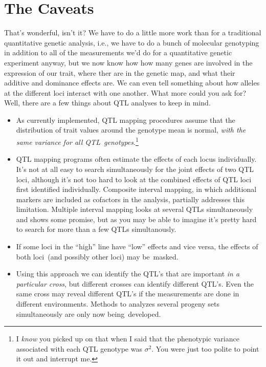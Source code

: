 \section*{The Caveats}

That's wonderful, isn't it? We have to do a little more work than for
a traditional quantitative genetic analysis, i.e., we have to do a
bunch of molecular genotyping in addition to all of the measurements
we'd do for a quantitative genetic experiment anyway, but we now know
how how many genes are involved in the expression of our trait, where
ther are in the genetic map, and what their additive and dominance effects
are. We can even tell something about how alleles at the different
loci interact with one another. What more could you ask for? Well,
there are a few things about QTL analyses to keep in mind.

\begin{itemize}

\item As currently implemented, QTL mapping procedures assume that the
  distribution of trait values around the genotype mean is normal,
  {\it with the same variance for all QTL~genotypes}.\footnote{I {\it
      know\/} you picked up on that when I said that the phenotypic
    variance associated with each QTL genotype was $\sigma^2$. You
    were just too polite to point it out and interrupt me.}

\item QTL mapping programs often estimate the effects of each locus
  individually. It's not at all easy to search simultaneously for the
  joint effects of two QTL loci, although it's not too hard to look at
  the combined effects of QTL loci first identified
  individually. Composite interval mapping, in which additional
  markers are included as cofactors in the analysis, partially
  addresses this limitation. Multiple interval mapping looks at
  several QTLs simultaneously and shows some promise, but as you may
  be able to imagine it's pretty hard to search for more than a few
  QTLs simultanously.

\item If some loci in the ``high'' line have ``low'' effects and vice
  versa, the effects of both loci~(and possibly other loci) may
  be~masked.

\item Using this approach we can identify the QTL's that are important
  {\it in a particular cross}, but different crosses can identify
  different QTL's. Even the same cross may reveal different QTL's if
  the measurements are done in different environments. Methods to
  analyzes several progeny sets simultaneously are only now
  being~developed.

\end{itemize}

